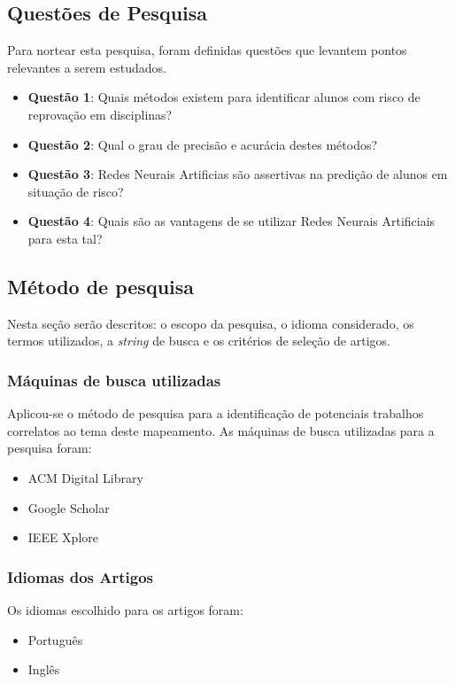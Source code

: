 \documentclass[
	12pt,				%
	openright,			%
	oneside,
	a4paper,			%
	english,			%
	french,				%
	spanish,			%
	brazil,				%
	]{abntex2}
\begin{document}
\subsection{Questões de Pesquisa}
\label{sec:QP}
Para nortear esta pesquisa, foram definidas questões que levantem pontos relevantes a serem estudados.
\begin{itemize}
    \item \textbf{Questão 1}: Quais métodos existem para identificar alunos com risco de reprovação em disciplinas?
    \item \textbf{Questão 2}: Qual o grau de precisão e acurácia destes métodos?
    \item \textbf{Questão 3}: Redes Neurais Artificias são assertivas na predição de alunos em situação de risco?
    \item \textbf{Questão 4}: Quais são as vantagens de se utilizar Redes Neurais Artificiais para esta tal?
\end{itemize}

\subsection{Método de pesquisa}
\label{sec:MP}
Nesta seção serão descritos: o escopo da pesquisa, o idioma considerado, os termos utilizados, a \textit{string} de busca e os critérios de seleção de artigos.

\subsubsection{Máquinas de busca utilizadas}
Aplicou-se o método de pesquisa para a identificação de potenciais trabalhos correlatos ao tema deste mapeamento. As máquinas de busca utilizadas para a pesquisa foram:
\begin{itemize}
    \item ACM Digital Library
    \item Google Scholar
    \item IEEE Xplore
\end{itemize}

\subsubsection{Idiomas dos Artigos}
Os idiomas escolhido para os artigos foram:

\begin{itemize}
    \item Português
    \item Inglês
\end{itemize}
\end{document}
